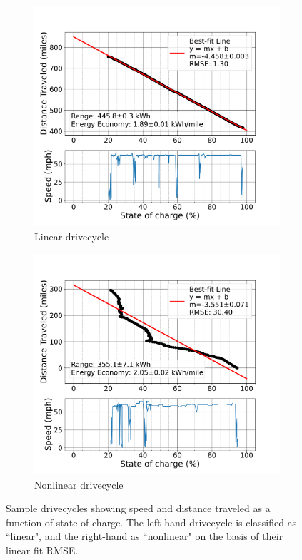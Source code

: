 \begin{figure}[H]
    \centering
    \begin{subfigure}[b]{0.48\textwidth}
        \centering
        \includegraphics[width=\textwidth]{figures/pepsi_1_battery_soc_vs_distance_event_9_linearfit.pdf}
        \caption{Linear drivecycle}
        \label{fig:distance_vs_soc_linear}
    \end{subfigure}
    \hfill
    \begin{subfigure}[b]{0.48\textwidth}
        \centering
        \includegraphics[width=\textwidth]{figures/pepsi_2_battery_soc_vs_distance_event_2_linearfit.pdf}
        \caption{Nonlinear drivecycle}
        \label{fig:distance_vs_soc_nonlinear}
    \end{subfigure}
    \caption{Sample drivecycles showing speed and distance traveled as a function of state of charge. The left-hand drivecycle is classified as ``linear", and the right-hand as ``nonlinear" on the basis of their linear fit RMSE.}
    \label{fig:distance_vs_soc}
\end{figure}

